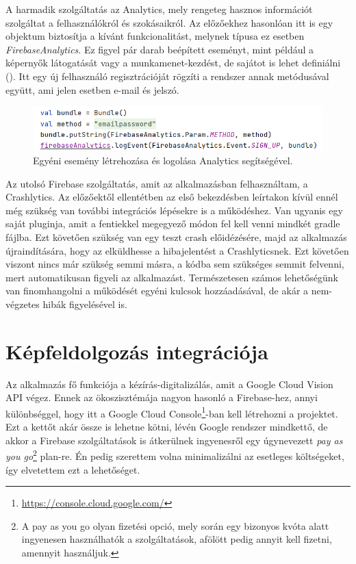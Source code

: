 A harmadik szolgáltatás az Analytics, mely rengeteg hasznos információt szolgáltat a felhasználókról és szokásaikról. Az előzőekhez hasonlóan itt is egy objektum biztosítja a kívánt funkcionalitást, melynek típusa ez esetben \emph{FirebaseAnalytics}. Ez figyel pár darab beépített eseményt, mint például a képernyők látogatását vagy a munkamenet-kezdést, de sajátot is lehet definiálni (). Itt egy új felhasználó regisztrációját rögzíti a rendszer annak metódusával együtt, ami jelen esetben e-mail és jelszó.

\begin{figure}[!ht]
	\centering
	\includegraphics[width=120mm, keepaspectratio]{figures/analytics_custom.png}
	\caption{Egyéni esemény létrehozása és logolása Analytics segítségével.}
	\label{fig:Analytics}
\end{figure}

Az utolsó Firebase szolgáltatás, amit az alkalmazásban felhasználtam, a Crashlytics. Az előzőektől ellentétben az első bekezdésben leírtakon kívül ennél még szükség van további integrációs lépésekre is a működéshez. Van ugyanis egy saját pluginja, amit a fentiekkel megegyező módon fel kell venni mindkét gradle fájlba. Ezt követően szükség van egy teszt crash előidézésére, majd az alkalmazás újraindítására, hogy az elküldhesse a hibajelentést a Crashlyticsnek. Ezt követően viszont nincs már szükség semmi másra, a kódba sem szükséges semmit felvenni, mert automatikusan figyeli az alkalmazást. Természetesen számos lehetőségünk van finomhangolni a működését egyéni kulcsok hozzáadásával, de akár a nem-végzetes hibák figyelésével is.

\section{Képfeldolgozás integrációja}
Az alkalmazás fő funkciója a kézírás-digitalizálás, amit a Google Cloud Vision API végez. Ennek az ökoszisztémája nagyon hasonló a Firebase-hez, annyi különbséggel, hogy itt a Google Cloud Console\footnote{\url{https://console.cloud.google.com/}}-ban kell létrehozni a projektet. Ezt a kettőt akár össze is lehetne kötni, lévén Google rendszer mindkettő, de akkor a Firebase szolgáltatások is átkerülnek ingyenesről egy úgynevezett \emph{pay as you go}\footnote{A pay as you go olyan fizetési opció, mely során egy bizonyos kvóta alatt ingyenesen használhatók a szolgáltatások, afölött pedig annyit kell fizetni, amennyit használjuk.} plan-re. Én pedig szerettem volna minimalizálni az esetleges költségeket, így elvetettem ezt a lehetőséget.
	
